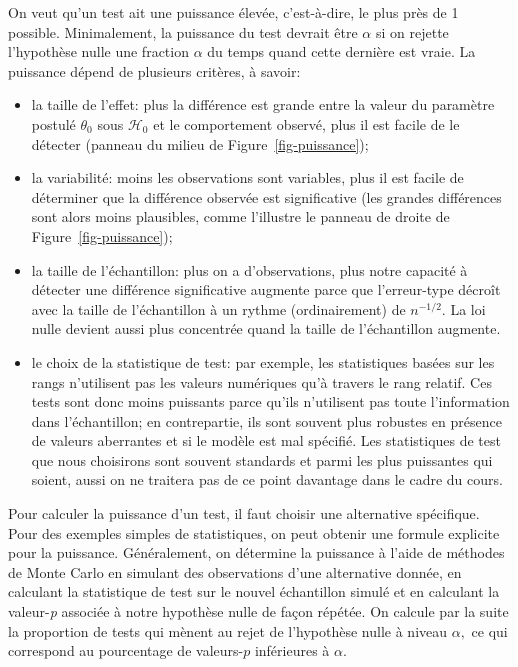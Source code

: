 \documentclass[
  11pt,
  letterpaper,
]{scrbook}
\providecommand{\tightlist}{%
  \setlength{\itemsep}{0pt}\setlength{\parskip}{0pt}}\usepackage{longtable,booktabs,array}
\theoremstyle{definition}
\theoremstyle{definition}
\theoremstyle{remark}
\begin{document}
On veut qu'un test ait une puissance élevée, c'est-à-dire, le plus près
de 1 possible. Minimalement, la puissance du test devrait être
\(\alpha\) si on rejette l'hypothèse nulle une fraction \(\alpha\) du
temps quand cette dernière est vraie. La puissance dépend de plusieurs
critères, à savoir:

\begin{itemize}
\tightlist
\item
  la taille de l'effet: plus la différence est grande entre la valeur du
  paramètre postulé \(\theta_0\) sous \(\mathscr{H}_0\) et le
  comportement observé, plus il est facile de le détecter (panneau du
  milieu de Figure~\ref{fig-puissance});
\item
  la variabilité: moins les observations sont variables, plus il est
  facile de déterminer que la différence observée est significative (les
  grandes différences sont alors moins plausibles, comme l'illustre le
  panneau de droite de Figure~\ref{fig-puissance});
\item
  la taille de l'échantillon: plus on a d'observations, plus notre
  capacité à détecter une différence significative augmente parce que
  l'erreur-type décroît avec la taille de l'échantillon à un rythme
  (ordinairement) de \(n^{-1/2}.\) La loi nulle devient aussi plus
  concentrée quand la taille de l'échantillon augmente.
\item
  le choix de la statistique de test: par exemple, les statistiques
  basées sur les rangs n'utilisent pas les valeurs numériques qu'à
  travers le rang relatif. Ces tests sont donc moins puissants parce
  qu'ils n'utilisent pas toute l'information dans l'échantillon; en
  contrepartie, ils sont souvent plus robustes en présence de valeurs
  aberrantes et si le modèle est mal spécifié. Les statistiques de test
  que nous choisirons sont souvent standards et parmi les plus
  puissantes qui soient, aussi on ne traitera pas de ce point davantage
  dans le cadre du cours.
\end{itemize}

Pour calculer la puissance d'un test, il faut choisir une alternative
spécifique. Pour des exemples simples de statistiques, on peut obtenir
une formule explicite pour la puissance. Généralement, on détermine la
puissance à l'aide de méthodes de Monte Carlo en simulant des
observations d'une alternative donnée, en calculant la statistique de
test sur le nouvel échantillon simulé et en calculant la valeur-\emph{p}
associée à notre hypothèse nulle de façon répétée. On calcule par la
suite la proportion de tests qui mènent au rejet de l'hypothèse nulle à
niveau \(\alpha,\) ce qui correspond au pourcentage de valeurs-\(p\)
inférieures à \(\alpha.\)
\end{document}
